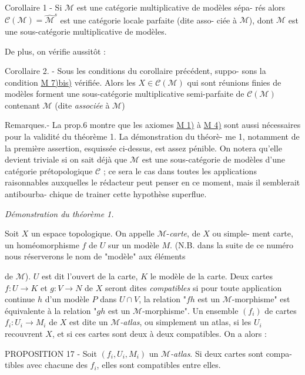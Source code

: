 Corollaire 1 - Si $\mathcal{M}$ est une catégorie multiplicative de modèles sépa-
rés alors $\mathcal{C}(\mathcal{M}) = \hat{\mathcal{M}}^s$ est une catégorie locale parfaite (dite asso-
ciée à $\mathcal{M}$), dont $\mathcal{M}$ est une sous-catégorie multiplicative de modèles.

De plus, on vérifie aussitôt :

Corollaire 2. - Sous les conditions du corollaire précédent, suppo-
sons la condition \underline{M 7)bis)} vérifiée. Alors les $X \in \mathcal{C}(\mathcal{M})$ qui sont
réunions finies de modèles forment une sous-catégorie multiplicative
semi-parfaite de $\mathcal{C}(\mathcal{M})$ contenant $\mathcal{M}$ (dite \emph{associée} à $\mathcal{M}$)

Remarques.- La prop.6 montre que les axiomes \underline{M 1)} à \underline{M 4)} sont aussi
nécessaires pour la validité du théorème 1. La démonstration du théorè-
me 1, notamment de la première assertion, esquissée ci-dessus, est
assez pénible. On notera qu'elle devient triviale si on sait déjà que
$\mathcal{M}$ est une sous-catégorie de modèles d'une catégorie prétopologique
$\mathcal{C}$ ; ce sera le cas dans toutes les applications raisonnables auxquelles
le rédacteur peut penser en ce moment, mais il semblerait antibourba-
chique de trainer cette hypothèse superflue.

\emph{Démonstration du théorème 1.}

Soit $X$ un espace topologique. On appelle $\mathcal{M}$-\emph{carte}, de $X$ ou simple-
ment carte, un homéomorphisme $f$ de $U$ sur un modèle $M$. (N.B. dans la
suite de ce numéro nous réserverons le nom de "modèle" aux éléments

\newpage



de $\mathcal{M}$). $U$ est dit l'ouvert de la carte, $K$ le modèle de la carte. Deux
cartes $f:U \to K$ et $g:V \to N$ de $X$ seront dites \emph{compatibles} si pour toute
application continue $h$ d'un modèle $P$ dans $U \cap V$, la relation "$fh$ est un
$\mathcal{M}$-morphisme" est équivalente à la relation "$gh$ est un $\mathcal{M}$-morphisme".
Un ensemble $(f_i)$ de cartes $f_i : U_i \to M_i$ de $X$ est dite un \emph{$\mathcal{M}$-atlas},
ou simplement un atlas, si les $U_i$ recouvrent $X$, et si ces cartes sont
deux à deux compatibles. On a alors :

PROPOSITION 17 - Soit $(f_i, U_i, M_i)$ un \emph{$\mathcal{M}$-atlas}. Si deux cartes sont compa-
tibles avec chacune des $f_i$, elles sont compatibles entre elles.

